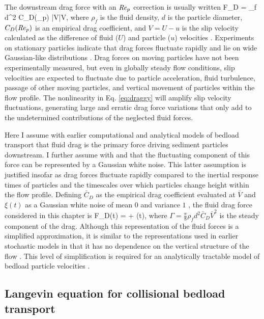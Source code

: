 The downstream drag force with an $\mbox{\textit{Re}}_p$ correction is usually written 
\be F_D =  \rho_f d^2 C_D(\Rey_p) |V|V, \label{eq:draggy}\ee
where $\rho_f$ is the fluid density, $d$ is the particle diameter, $C_D(\mbox{\textit{Re}}_p)$ is an empirical drag coefficient, and $V = U-u$ is the slip velocity calculated as the difference of fluid ($U$) and particle ($u$) velocities \citep{Coleman1967, Schmeeckle2007, Dwivedi2012}.
Experiments on stationary particles indicate that drag forces fluctuate rapidly and lie on wide Gaussian-like distributions \citep{Hofland2006,Schmeeckle2007,Dwivedi2010,Celik2014}.
Drag forces on moving particles have not been experimentally measured, but even in globally steady flow conditions, slip velocities are expected to fluctuate due to particle acceleration, fluid turbulence, passage of other moving particles, and vertical movement of particles within the flow profile.
The nonlinearity in Eq. \ref{eq:draggy} will amplify slip velocity fluctuations, generating large and erratic drag force variations that only add to the undetermined contributions of the neglected fluid forces.

Here I assume with earlier computational \citep{Schmeeckle2014,Gonzalez2017,Elghannay2017} and analytical \citep[e.g.][]{Ancey2014,Fan2014} models of bedload transport that fluid drag is the primary force driving sediment particles downstream. I further assume with \citet{Fan2014} and \citet{Ancey2014} that the fluctuating component of this force can be represented by a Gaussian white noise.
This latter assumption is justified insofar as drag forces fluctuate rapidly compared to the inertial response times of particles and the timescales over which particles change height within the flow profile.
Defining $\bar{C}_D$ as the empirical drag coefficient evaluated at $\bar{V}$ and $\xi(t)$ as a Gaussian white noise of mean $0$ and variance $1$ \citep[e.g.][]{Gardiner1983}, the fluid drag force considered in this chapter is
\be F_D(t) = \Gamma +  \eta(t), \label{eq:drag}\ee
where $\Gamma = \frac{\pi}{8}
\rho_f d^2 \bar{C}_D \bar{V}^2$ is the steady component of the drag.
Although this representation of the fluid forces is a simplified approximation, it is similar to the representations used in earlier stochastic models in that it has no dependence on the vertical structure of the flow \citep[e.g.][]{Fan2014,Ancey2014}. This level of simplification is required for an analytically tractable model of bedload particle velocities \citep[e.g.][]{Michaelides1997}.

\subsection{Langevin equation for collisional bedload transport}

